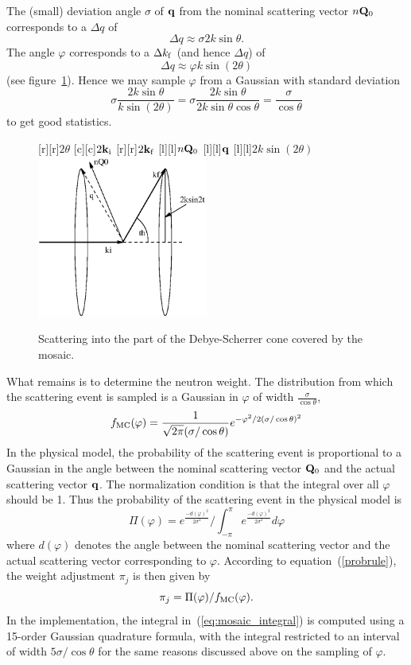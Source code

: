 The (small) deviation angle $\sigma$ of ${\bf q}$ from the nominal
scattering vector $n{\bf Q}_0$ corresponds to a $\Delta q$ of
$$ \Delta q \approx \sigma 2k\sin\theta. $$
The angle $\varphi$ corresponds to a $\Delta k_{\rm f}$ (and hence
$\Delta q$) of
$$ \Delta q \approx \varphi k \sin(2\theta) $$
(see figure~\ref{f:mosaic_cone}).
Hence we may sample $\varphi$ from a Gaussian with standard deviation
$$ \sigma\frac{2k\sin\theta}{k\sin(2\theta)} =
\sigma\frac{2k\sin\theta}{2k\sin\theta\cos\theta} =
\frac{\sigma}{\cos\theta} $$
to get good statistics.
%
\begin{figure}
  \begin{center}
    [r][r]{$2\theta$}
    [c][c]{$2{\bf k}_{\rm i}$}
    [r][r]{$2{\bf k}_{\rm f}$}
    [l][l]{$n{\bf Q}_0$}
    [l][l]{$\bf q$}
    [l][l]{$2 k \sin(2 \theta)$}
    \includegraphics[width=0.5\textwidth]{figures/mosaic_cone.eps}
  \end{center}
\caption{Scattering into the part of the Debye-Scherrer cone covered by
    the mosaic.}
\label{f:mosaic_cone}
\end{figure}

What remains is to determine the neutron weight. The distribution from
which the scattering event is sampled is a Gaussian in $\varphi$ of
width $\frac{\sigma}{\cos\theta}$,
$$ f_{\rm MC}(\varphi) = \frac{1}{\sqrt{2\pi}(\sigma/\cos\theta)}
            e^{-\varphi^2/2(\sigma/\cos\theta)^2}
$$
In the physical model, the probability of the scattering event is
proportional to a Gaussian in the angle between the nominal scattering
vector ${\bf Q}_0$ and the actual scattering vector ${\bf q}$. The
normalization condition is that the integral over all $\varphi$ should
be 1. Thus the probability of the scattering event in the physical model
is
\begin{equation}
  \label{eq:mosaic_integral}
  \Pi(\varphi) = e^{\frac{-d(\varphi)^2}{2\sigma^2}} /
   \int_{-\pi}^{\pi} e^{\frac{-d(\varphi)^2}{2\sigma^2}} d\varphi
\end{equation}
where $d(\varphi)$ denotes the angle between the nominal scattering
vector and the actual scattering vector corresponding to $\varphi$.
According to equation~(\ref{probrule}), the weight adjustment $\pi_j$ is
then given by
$$ \pi_j = \Pi(\varphi) / f_{\rm MC}(\varphi). $$
In the implementation, the integral in~(\ref{eq:mosaic_integral}) is computed
using a 15-order Gaussian quadrature formula, with the integral
restricted to an interval of width $5\sigma/\cos\theta$ for the same
reasons discussed above on the sampling of $\varphi$.

